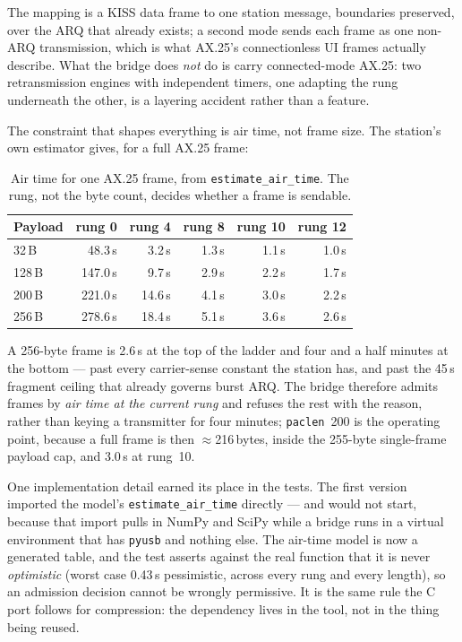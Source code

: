 The mapping is a KISS data frame to one station message, boundaries
preserved, over the ARQ that already exists; a second mode sends each
frame as one non-ARQ transmission, which is what AX.25's connectionless
UI frames actually describe.  What the bridge does \emph{not} do is
carry connected-mode AX.25: two retransmission engines with independent
timers, one adapting the rung underneath the other, is a layering
accident rather than a feature.

The constraint that shapes everything is air time, not frame size.  The
station's own estimator gives, for a full AX.25 frame:

\begin{table}[H]
    \centering
    \caption{Air time for one AX.25 frame, from
             \texttt{estimate\_air\_time}.  The rung, not the byte
             count, decides whether a frame is sendable.}
    \label{tab:kiss_air}
    \small
    \begin{tabular}{@{}lrrrrr@{}}
    \toprule
    \textbf{Payload} & \textbf{rung 0} & \textbf{rung 4} &
    \textbf{rung 8} & \textbf{rung 10} & \textbf{rung 12} \\
    \midrule
    32\,B  & 48.3\,s  & 3.2\,s  & 1.3\,s & 1.1\,s & 1.0\,s \\
    128\,B & 147.0\,s & 9.7\,s  & 2.9\,s & 2.2\,s & 1.7\,s \\
    200\,B & 221.0\,s & 14.6\,s & 4.1\,s & 3.0\,s & 2.2\,s \\
    256\,B & 278.6\,s & 18.4\,s & 5.1\,s & 3.6\,s & 2.6\,s \\
    \bottomrule
    \end{tabular}
\end{table}

A 256-byte frame is 2.6\,s at the top of the ladder and four and a half
minutes at the bottom --- past every carrier-sense constant the station
has, and past the 45\,s fragment ceiling that already governs burst
ARQ.  The bridge therefore admits frames by \emph{air time at the
current rung} and refuses the rest with the reason, rather than keying
a transmitter for four minutes; \texttt{paclen}~200 is the operating
point, because a full frame is then $\approx$216\,bytes, inside the
255-byte single-frame payload cap, and 3.0\,s at rung~10.

One implementation detail earned its place in the tests.  The first
version imported the model's \texttt{estimate\_air\_time} directly ---
and would not start, because that import pulls in NumPy and SciPy while
a bridge runs in a virtual environment that has \texttt{pyusb} and
nothing else.  The air-time model is now a generated table, and the
test asserts against the real function that it is never
\emph{optimistic} (worst case 0.43\,s pessimistic, across every rung
and every length), so an admission decision cannot be wrongly
permissive.  It is the same rule the C port follows for compression:
the dependency lives in the tool, not in the thing being reused.

